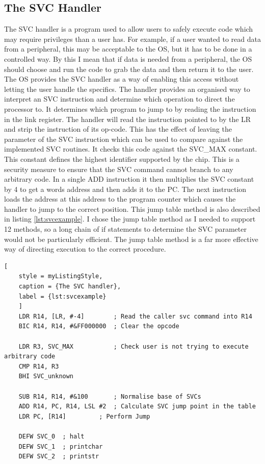 \subsection{The SVC Handler}
The SVC handler is a program used to allow users to safely execute code which may require privileges than a user has. For example, if a user wanted to read data from a peripheral, this may be acceptable to the OS, but it has to be done in a controlled way. By this I mean that if data is needed from a peripheral, the OS should choose and run the code to grab the data and then return it to the user. The OS provides the SVC handler as a way of enabling this access without letting the user handle the specifics. The handler provides an organised way to interpret an SVC instruction and determine which operation to direct the processor to. It determines which program to jump to by reading the instruction in the link register. The handler will read the instruction pointed to by the LR and strip the instruction of its op-code. This has the effect of leaving the parameter of the SVC instruction which can be used to compare against the implemented SVC routines. It checks this code against the SVC\_MAX constant. This constant defines the highest identifier supported by the chip.  This is a security measure to ensure that the SVC command cannot branch to any arbitrary code. In a single ADD instruction it then multiplies the SVC constant by 4 to get a words address and then adds it to the PC. The next instruction loads the address at this address to the program counter which causes the handler to jump to the correct position. This jump table method is also described in listing \ref{lst:svcexample}. I chose the jump table method as I needed to support 12 methods, so a long chain of if statements to determine the SVC parameter would not be particularly efficient. The jump table method is a far more effective way of directing execution to the correct procedure.


\begin{lstlisting}[
	style = myListingStyle,
	caption = {The SVC handler},
	label = {lst:svcexample}
	]
	LDR R14, [LR, #-4]        ; Read the caller svc command into R14
	BIC R14, R14, #&FF000000  ; Clear the opcode
	
	LDR R3, SVC_MAX	          ; Check user is not trying to execute arbitrary code
	CMP R14, R3 
	BHI SVC_unknown
	
	SUB R14, R14, #&100       ; Normalise base of SVCs
	ADD R14, PC, R14, LSL #2  ; Calculate SVC jump point in the table
	LDR PC, [R14] 		  ; Perform Jump       
	
	DEFW SVC_0  ; halt
	DEFW SVC_1  ; printchar
	DEFW SVC_2  ; printstr
	
\end{lstlisting}


